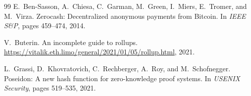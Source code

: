 \documentclass[11pt,a4paper]{article}
\theoremstyle{definition}
\begin{document}
\begin{thebibliography}{99}
E.~Ben-Sasson, A.~Chiesa, C.~Garman, M.~Green, I.~Miers, E.~Tromer, and M.~Virza.
\newblock Zerocash: Decentralized anonymous payments from {Bitcoin}.
\newblock In {\em IEEE S\&P}, pages 459--474, 2014.

V.~Buterin.
\newblock An incomplete guide to rollups.
\newblock \url{https://vitalik.eth.limo/general/2021/01/05/rollup.html}, 2021.

L.~Grassi, D.~Khovratovich, C.~Rechberger, A.~Roy, and M.~Schofnegger.
\newblock Poseidon: A new hash function for zero-knowledge proof systems.
\newblock In {\em USENIX Security}, pages 519--535, 2021.

\end{thebibliography}
\end{document}
